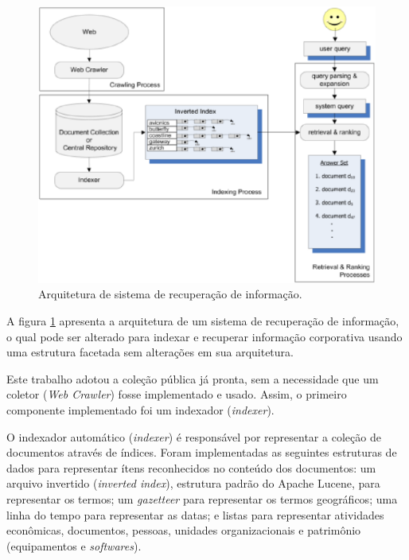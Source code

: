 \begin{figure}
	\caption[Arquitetura de sistema de recuperação de informação]{\label{fig:ir-architecture}Arquitetura de sistema de recuperação de informação.}

	\centering
		\includegraphics[width=1.0\textwidth]{fig/ir-architecture.eps}

\end{figure}

A figura \ref{fig:ir-architecture} apresenta a arquitetura de um sistema de recuperação de informação, o qual pode ser alterado para indexar e recuperar informação corporativa usando uma estrutura facetada sem alterações em sua arquitetura.

Este trabalho adotou a coleção pública já pronta, sem a necessidade que um coletor (\textit{Web Crawler}) fosse implementado e usado. Assim, o primeiro componente implementado foi um indexador (\textit{indexer}).

O indexador automático (\textit{indexer}) é responsável por representar a coleção de documentos através de índices. Foram implementadas as seguintes estruturas de dados para representar ítens reconhecidos no conteúdo dos documentos: um arquivo invertido (\textit{inverted index}), estrutura padrão do Apache Lucene, para representar os termos; um \textit{gazetteer} para representar os termos geográficos; uma linha do tempo para representar as datas; e listas para representar atividades econômicas, documentos, pessoas, unidades organizacionais e patrimônio (equipamentos e \textit{softwares}).

